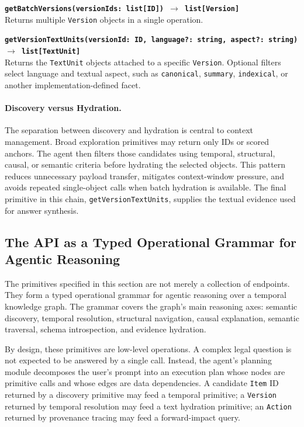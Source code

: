 \documentclass[11pt]{article}
\begin{document}
\vspace{0.3cm}
\noindent\textbf{\texttt{getBatchVersions(versionIds: list[ID]) $\rightarrow$ list[Version]}}\\
Returns multiple \texttt{Version} objects in a single operation.

\vspace{0.3cm}
\noindent\textbf{\texttt{getVersionTextUnits(versionId: ID, language?: string, aspect?: string)}} \newline
\textbf{\texttt{$\rightarrow$ list[TextUnit]}}\\
Returns the \texttt{TextUnit} objects attached to a specific \texttt{Version}. Optional filters select language and textual aspect, such as \texttt{canonical}, \texttt{summary}, \texttt{indexical}, or another implementation-defined facet.

\paragraph{Discovery versus Hydration.}
The separation between discovery and hydration is central to context management. Broad exploration primitives may return only IDs or scored anchors. The agent then filters those candidates using temporal, structural, causal, or semantic criteria before hydrating the selected objects. This pattern reduces unnecessary payload transfer, mitigates context-window pressure, and avoids repeated single-object calls when batch hydration is available. The final primitive in this chain, \texttt{getVersionTextUnits}, supplies the textual evidence used for answer synthesis.

\subsection{The API as a Typed Operational Grammar for Agentic Reasoning}
\label{subsec:api_grammar}

The primitives specified in this section are not merely a collection of endpoints. They form a typed operational grammar for agentic reasoning over a temporal knowledge graph. The grammar covers the graph's main reasoning axes: semantic discovery, temporal resolution, structural navigation, causal explanation, semantic traversal, schema introspection, and evidence hydration.

By design, these primitives are low-level operations. A complex legal question is not expected to be answered by a single call. Instead, the agent's planning module decomposes the user's prompt into an execution plan whose nodes are primitive calls and whose edges are data dependencies. A candidate \texttt{Item} ID returned by a discovery primitive may feed a temporal primitive; a \texttt{Version} returned by temporal resolution may feed a text hydration primitive; an \texttt{Action} returned by provenance tracing may feed a forward-impact query.
\end{document}
